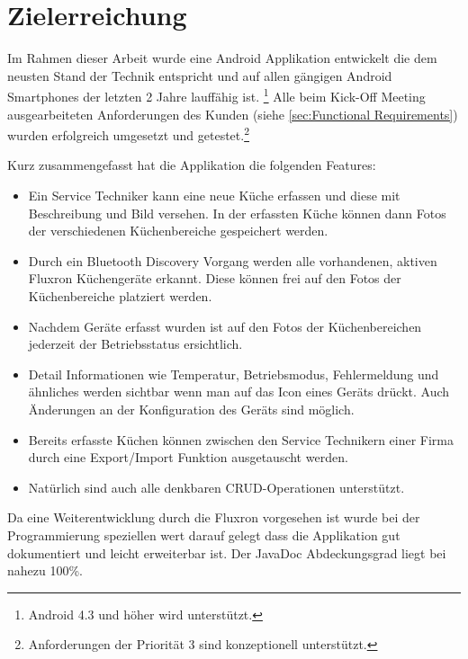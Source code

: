 \section{Zielerreichung}

Im Rahmen dieser Arbeit wurde eine Android Applikation entwickelt die dem neusten Stand der Technik entspricht und auf allen gängigen Android Smartphones der letzten 2 Jahre lauffähig ist. \footnote{Android 4.3 und höher wird unterstützt.} Alle beim Kick-Off Meeting ausgearbeiteten Anforderungen des Kunden (siehe \ref{sec:Functional Requirements}) wurden erfolgreich umgesetzt und getestet.\footnote{Anforderungen der Priorität 3 sind konzeptionell unterstützt.}

Kurz zusammengefasst hat die Applikation die folgenden Features:

\begin{itemize}
\item Ein Service Techniker kann eine neue Küche erfassen und diese mit Beschreibung und Bild versehen. In der erfassten Küche können dann Fotos der verschiedenen Küchenbereiche gespeichert werden. 
\item Durch ein Bluetooth Discovery Vorgang werden alle vorhandenen, aktiven Fluxron Küchengeräte erkannt. Diese können frei auf den Fotos der Küchenbereiche platziert werden.
\item Nachdem Geräte erfasst wurden ist auf den Fotos der Küchenbereichen jederzeit der Betriebsstatus ersichtlich. 
\item Detail Informationen wie Temperatur, Betriebsmodus, Fehlermeldung und ähnliches werden sichtbar wenn man auf das Icon eines Geräts drückt. Auch Änderungen an der Konfiguration des Geräts sind möglich.
\item Bereits erfasste Küchen können zwischen den Service Technikern einer Firma durch eine Export/Import Funktion ausgetauscht werden.
\item Natürlich sind auch alle denkbaren \ac{CRUD}-Operationen unterstützt.
\end{itemize}

Da eine Weiterentwicklung durch die Fluxron vorgesehen ist wurde bei der Programmierung speziellen wert darauf gelegt dass die Applikation gut dokumentiert und leicht erweiterbar ist. Der JavaDoc Abdeckungsgrad liegt bei nahezu 100\%.